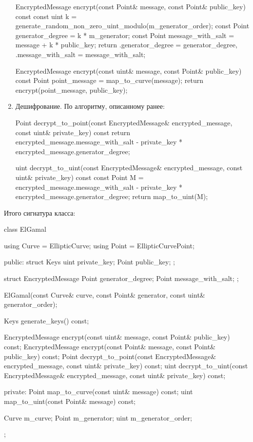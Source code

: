 \begin{enumerate}
\begin{cppcode}
EncryptedMessage encrypt(const Point& message, const Point& public_key) const {
    const uint k = generate_random_non_zero_uint_modulo(m_generator_order);
    const Point generator_degree = k * m_generator;
    const Point message_with_salt = message + k * public_key;
    return {.generator_degree = generator_degree, .message_with_salt = message_with_salt};
}

EncryptedMessage encrypt(const uint& message, const Point& public_key) const {
    Point point_message = map_to_curve(message);
    return encrypt(point_message, public_key);
}
  \end{cppcode}
  \item Дешифрование. По алгоритму, описанному ранее:
  \begin{cppcode}
Point decrypt_to_point(const EncryptedMessage& encrypted_message, const uint& private_key) const {
    return encrypted_message.message_with_salt - private_key * encrypted_message.generator_degree;
}

uint decrypt_to_uint(const EncryptedMessage& encrypted_message, const uint& private_key) const {
    const Point M = encrypted_message.message_with_salt
                    - private_key * encrypted_message.generator_degree;
    return map_to_uint(M);
}

  \end{cppcode}
\end{enumerate}

Итого сигнатура класса:
\begin{cppcode}
class ElGamal {
    using Curve = EllipticCurve;
    using Point = EllipticCurvePoint;

public:
    struct Keys {
        uint private_key;
        Point public_key;
    };

    struct EncryptedMessage {
        Point generator_degree;
        Point message_with_salt;
    };

    ElGamal(const Curve& curve, const Point& generator, const uint& generator_order);

    Keys generate_keys() const;

    EncryptedMessage encrypt(const uint& message, const Point& public_key) const;
    EncryptedMessage encrypt(const Point& message, const Point& public_key) const;
    Point decrypt_to_point(const EncryptedMessage& encrypted_message, const uint& private_key) const;
    uint decrypt_to_uint(const EncryptedMessage& encrypted_message, const uint& private_key) const;

private:
    Point map_to_curve(const uint& message) const;
    uint map_to_uint(const Point& message) const;

    Curve m_curve;
    Point m_generator;
    uint m_generator_order;
};
\end{cppcode}

